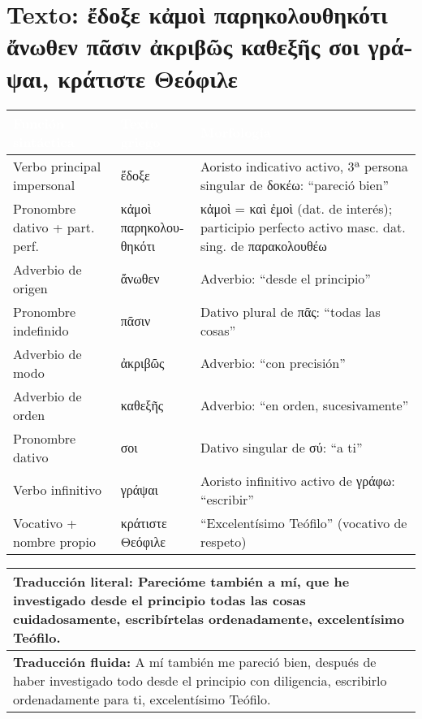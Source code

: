 \documentclass[a4paper,12pt]{article}
\begin{document}

\section{Texto: \textgreek{ἔδοξε κἀμοὶ παρηκολουθηκότι ἄνωθεν πᾶσιν ἀκριβῶς καθεξῆς σοι γράψαι, κράτιστε Θεόφιλε}}

\begin{tabularx}{\textwidth}{|Y|Y|Y|}
	\textcolor{white}{\textbf{Función sintáctica}} & \textcolor{white}{\textbf{Texto griego}} & \textcolor{white}{\textbf{Morfología}} \\
	\hline
	Verbo principal impersonal & \textgreek{ἔδοξε} & Aoristo indicativo activo, 3ª persona singular de \textgreek{δοκέω}: “pareció bien” \\
	\hline
	Pronombre dativo + part. perf. & \textgreek{κἀμοὶ παρηκολουθηκότι} & \textgreek{κἀμοὶ} = καὶ ἐμοὶ (dat. de interés); participio perfecto activo masc. dat. sing. de \textgreek{παρακολουθέω} \\
	\hline
	Adverbio de origen & \textgreek{ἄνωθεν} & Adverbio: “desde el principio” \\
	\hline
	Pronombre indefinido & \textgreek{πᾶσιν} & Dativo plural de \textgreek{πᾶς}: “todas las cosas” \\
	\hline
	Adverbio de modo & \textgreek{ἀκριβῶς} & Adverbio: “con precisión” \\
	\hline
	Adverbio de orden & \textgreek{καθεξῆς} & Adverbio: “en orden, sucesivamente” \\
	\hline
	Pronombre dativo & \textgreek{σοι} & Dativo singular de \textgreek{σύ}: “a ti” \\
	\hline
	Verbo infinitivo & \textgreek{γράψαι} & Aoristo infinitivo activo de \textgreek{γράφω}: “escribir” \\
	\hline
	Vocativo + nombre propio & \textgreek{κράτιστε Θεόφιλε} & “Excelentísimo Teófilo” (vocativo de respeto) \\
	\hline
\end{tabularx}

\vspace{0.5cm}

\begin{tabularx}{\textwidth}{|Y|}
	\hline
	\textbf{Traducción literal:} Parecióme también a mí, que he investigado desde el principio todas las cosas cuidadosamente, escribírtelas ordenadamente, excelentísimo Teófilo. \\
	\hline
	\textbf{Traducción fluida:} A mí también me pareció bien, después de haber investigado todo desde el principio con diligencia, escribirlo ordenadamente para ti, excelentísimo Teófilo. \\
	\hline
\end{tabularx}
\end{document}
